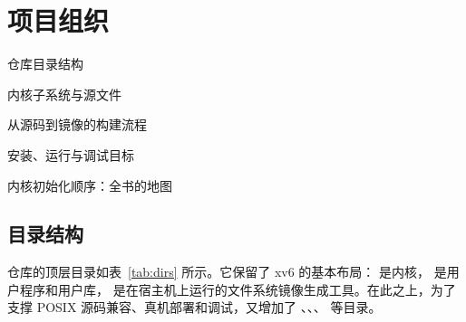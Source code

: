 \chapter{项目组织}
\label{chap:organization}

\begin{introduction}[本章内容]
  \item 仓库目录结构
  \item 内核子系统与源文件
  \item 从源码到镜像的构建流程
  \item 安装、运行与调试目标
  \item 内核初始化顺序：全书的地图
\end{introduction}

\section{目录结构}

仓库的顶层目录如表~\ref{tab:dirs} 所示。它保留了 xv6 的基本布局： 是内核， 是用户程序和用户库， 是在宿主机上运行的文件系统镜像生成工具。在此之上，为了支撑 POSIX 源码兼容、真机部署和调试，又增加了 、、、 等目录。


